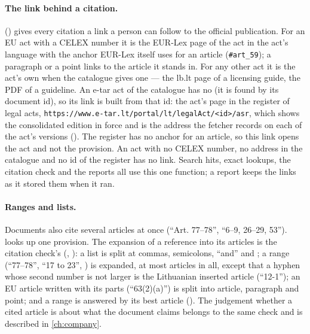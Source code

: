 \paragraph{The link behind a citation.}  () gives every citation a
link a person can follow to the official publication. For an EU act with a CELEX number it is
the EUR-Lex page of the act in the act's language with the anchor EUR-Lex itself uses for an
article (\texttt{\#art\_59}); a paragraph or a point links to the article it stands in. For
any other act it is the act's own  when the catalogue gives one --- the lb.lt
page of a licensing guide,
the PDF of a guideline. An e-tar act of the catalogue has no  (it is found by
its document id), so its link is built from that id: the act's page in the register of legal
acts, \texttt{https://www.e-tar.lt/portal/lt/legalAct/<id>/asr}, which shows the consolidated
edition in force and is the address the fetcher records on each of the act's
versions (). The register has no anchor for an
article, so this link opens the act and not the provision. An act with no CELEX number, no
address in the catalogue and no id of the register has no link. Search hits, exact lookups, the
citation check and the reports all use this one function; a report keeps the links as it
stored them when it ran.

\paragraph{Ranges and lists.} Documents also cite several articles at once
(\enquote{Art. 77–78}, \enquote{6–9, 26–29, 53}).  looks up one
provision. The expansion of a reference into its articles is the citation check's
(, ): a list is split at commas, semicolons,
\enquote{and} and ; a range (\enquote{77–78}, \enquote{17 to 23}, ) is
expanded, at most  articles in all, except that a hyphen whose
second number is not larger is the Lithuanian inserted article (\enquote{12-1}); an EU article
written with its parts (\enquote{63(2)(a)}) is split into article, paragraph and point; and a
range is answered by its best article (). The judgement whether a cited
article is about what the document claims belongs to the same check and is described in
\cref{ch:company}.


